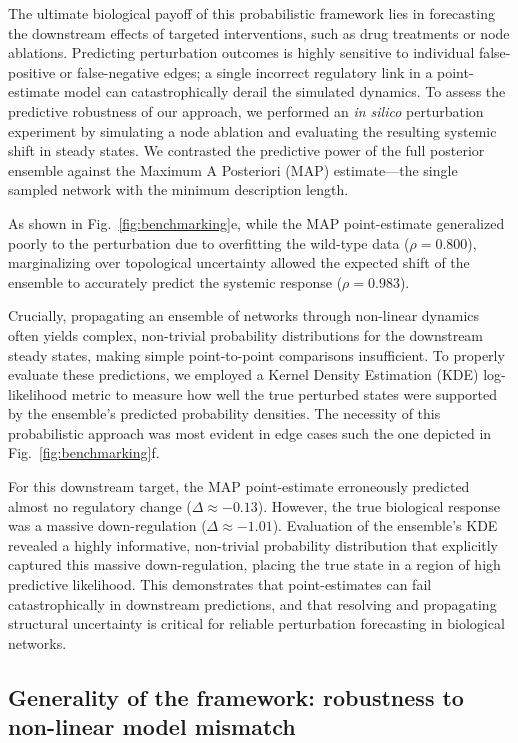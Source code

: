 \documentclass[10pt, aps, rmp,  twocolumn, superscriptaddress, floatfix, showkeys]{revtex4-2}
\begin{document}
The ultimate biological payoff of this probabilistic framework lies in forecasting the downstream effects of targeted interventions, such as drug treatments or node ablations. Predicting perturbation outcomes is highly sensitive to individual false-positive or false-negative edges; a single incorrect regulatory link in a point-estimate model can catastrophically derail the simulated dynamics. To assess the predictive robustness of our approach, we performed an \textit{in silico} perturbation experiment by simulating a node ablation and evaluating the resulting systemic shift in steady states. We contrasted the predictive power of the full posterior ensemble against the Maximum A Posteriori (MAP) estimate---the single sampled network with the minimum description length.

As shown in Fig.~\ref{fig:benchmarking}e, while the MAP point-estimate generalized poorly to the perturbation due to overfitting the wild-type data ($\rho = 0.800$), marginalizing over topological uncertainty allowed the expected shift of the ensemble to accurately predict the systemic response ($\rho = 0.983$). 

Crucially, propagating an ensemble of networks through non-linear dynamics often yields complex, non-trivial probability distributions for the downstream steady states, making simple point-to-point comparisons insufficient. To properly evaluate these predictions, we employed a Kernel Density Estimation (KDE) log-likelihood metric to measure how well the true perturbed states were supported by the ensemble's predicted probability densities. The necessity of this probabilistic approach was most evident in edge cases such the one depicted in Fig.~\ref{fig:benchmarking}f. 

For this downstream target, the MAP point-estimate erroneously predicted almost no regulatory change ($\Delta \approx -0.13$). However, the true biological response was a massive down-regulation ($\Delta \approx -1.01$). Evaluation of the ensemble's KDE revealed a highly informative, non-trivial probability distribution that explicitly captured this massive down-regulation, placing the true state in a region of high predictive likelihood. This demonstrates that point-estimates can fail catastrophically in downstream predictions, and that resolving and propagating structural uncertainty is critical for reliable perturbation forecasting in biological networks.

\subsection{Generality of the framework: robustness to non-linear model mismatch}
\end{document}
